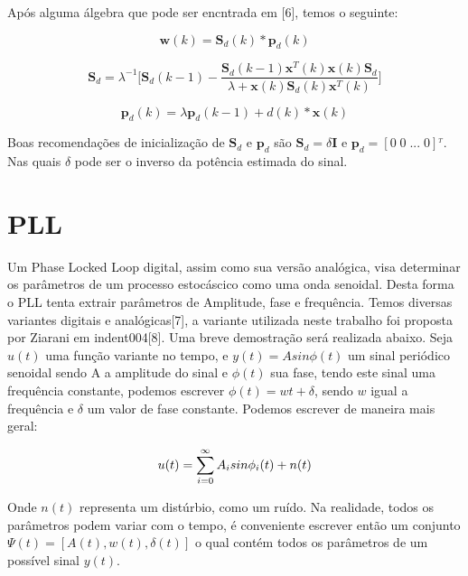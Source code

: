 \documentclass[a4paper, 12pt]{book}
\begin{document}
\indent Após alguma álgebra que pode ser encntrada em [6], temos o seguinte:

\Large
\begin{equation}
    \boldsymbol{w}(k)=\boldsymbol{S}_d(k)*\boldsymbol{p}_d(k)
\end{equation}


\begin{equation}
    \boldsymbol{S}_d=\lambda^{-1}\Bigg[\boldsymbol{S}_d(k-1)-\frac{\boldsymbol{S}_d(k-1)\boldsymbol{x}^T(k)\boldsymbol{x}(k)\boldsymbol{S}_d}{\lambda+\boldsymbol{x}(k)\boldsymbol{S}_d(k)\boldsymbol{x}^T(k)}\Bigg]
\end{equation}

\begin{equation}
    \boldsymbol{p}_d(k)=\lambda \boldsymbol{p}_d(k-1)+d(k)*\boldsymbol{x}(k)
\end{equation}
\normalsize

\indent Boas recomendações de inicialização de $\boldsymbol{S}_d$ e $\boldsymbol{p}_d$ são $\boldsymbol{S}_d=\delta \boldsymbol{I}$ e $\boldsymbol{p}_d=[0\;0\;...\;0]^_T$. Nas quais $\delta$ pode ser o inverso da potência estimada do sinal.

\section{PLL}

\indent Um Phase Locked Loop digital, assim como sua versão analógica, visa determinar os parâmetros de um processo estocáscico como uma onda senoidal. Desta forma o PLL tenta extrair parâmetros de Amplitude, fase e frequência. Temos diversas variantes digitais e analógicas[7], a variante utilizada neste trabalho foi proposta por Ziarani em indent004[8]. Uma breve demostração será realizada abaixo.
\indent Seja $u(t)$ uma função variante no tempo, e $y(t)=Asin\phi(t)$ um sinal periódico senoidal sendo A a amplitude do sinal e $\phi(t)$ sua fase, tendo este sinal uma frequência constante, podemos escrever $\phi(t)=wt+\delta$, sendo $w$ igual a frequência e $\delta$ um valor de fase constante. Podemos escrever de maneira mais geral:

\begin{equation}
    u(t)=\sum_{i=0}^{\infty}A_i sin\phi_i(t)\space+\space n(t)
\end{equation}

Onde $n(t)$ representa um distúrbio, como um ruído. Na realidade, todos os parâmetros podem variar com o tempo, é conveniente escrever então um conjunto $\Psi(t)=[A(t), w(t), \delta(t)]$ o qual contém todos os parâmetros de um possível sinal $y(t)$.
\end{document}
